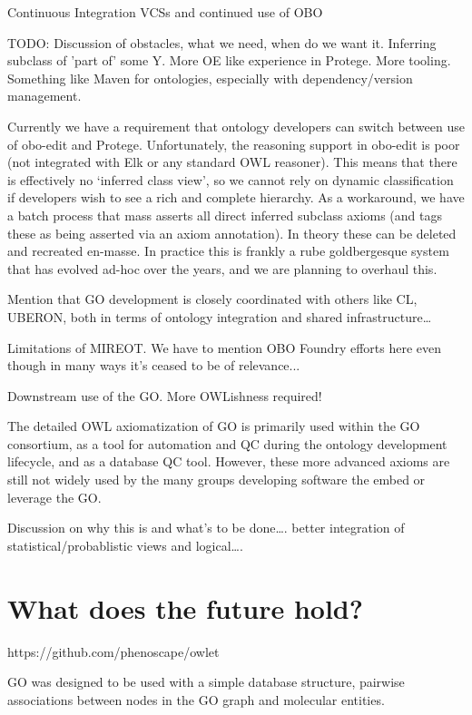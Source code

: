 \documentclass{llncs}
\begin{document}
Continuous Integration\cite{Mungall2012a}
VCSs and continued use of OBO

TODO: Discussion of obstacles, what we need, when do we want it. Inferring
subclass of 'part of' some Y. More OE like experience in Protege. More
tooling. Something like Maven for ontologies, especially with
dependency/version management.

Currently we have a requirement that ontology developers can switch between use of obo-edit and Protege. Unfortunately, the reasoning support in obo-edit is poor (not integrated with Elk or any standard OWL reasoner). This means that there is effectively no ‘inferred class view’, so we cannot rely on dynamic classification if developers wish to see a rich and complete hierarchy. As a workaround, we have a batch process that mass asserts all direct inferred subclass axioms (and tags these as being asserted via an axiom annotation). In theory these can be deleted and recreated en-masse. In practice this is frankly a rube goldbergesque system that has evolved ad-hoc over the years, and we are planning to overhaul this.

Mention that GO development is closely coordinated with others like CL, UBERON, both in terms of ontology integration and shared infrastructure…

Limitations of MIREOT. We have to mention OBO Foundry efforts here even though in many ways it’s ceased to be of relevance...

Downstream use of the GO. More OWLishness required!

The detailed OWL axiomatization of GO is primarily used within the GO consortium, as a tool for automation and QC during the ontology development lifecycle, and as a database QC tool. However, these more advanced axioms are still not widely used by the many groups developing software the embed or leverage the GO.

Discussion on why this is and what’s to be done…. better integration of statistical/probablistic views and logical….


\section{What does the future hold?}

https://github.com/phenoscape/owlet

GO was designed to be used with a simple database structure, pairwise associations between nodes in the GO graph and molecular entities. 
\end{document}
